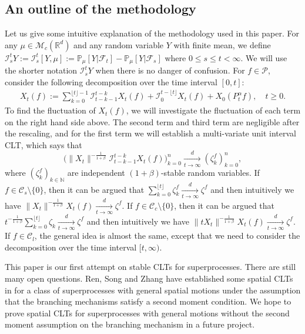 \documentclass[EJP]{ejpecp} %
\begin{document}
\subsection{An outline of the methodology}
Let us give some intuitive explanation of the methodology used in this paper.
For any $\mu\in \mathcal M_c(\mathbb R^d)$ and any random variable $Y$ with finite mean, we define
$
  \mathcal I_s^t Y
  := \mathcal I_s^t [Y, \mu]
  := \mathbb P_\mu[Y|\mathscr F_t] - \mathbb P_\mu[Y|\mathscr F_s]
$
  where $0 \leq s \leq t <\infty.$
We will use the shorter notation $\mathcal I_s^t Y$ when there is no danger of confusion.
For $f\in \mathcal{P}$, consider the following decomposition over the time interval $[0,t]$:
\begin{align}
  X_t(f)
  := \sum_{k=0}^{\lfloor t \rfloor-1} \mathcal I_{t-k-1}^{t-k} X_t (f)+\mathcal I_0^{t-\lfloor t \rfloor} X_t(f) + X_0( P^\alpha_tf),
  \quad t\geq 0.
\end{align}
To find the fluctuation of $X_t(f)$, we will investigate the fluctuation of each term on the right hand side above.
The second term and third term are negligible after the rescaling, and for the first term we will establish
a multi-variate unit interval CLT,  which says that
\[
  \Big( \|X_t\|^{-\frac{1}{1+\beta}}\mathcal I^{t-k}_{t-k-1} X_t(f) \Big)_{k=0}^n
  \xrightarrow [t\to \infty]{d} (\zeta^f_k)_{k=0}^n,
\]
where $(\zeta^f_k)_{k \in \mathbb N}$ are independent $(1+\beta)$-stable random variables.
If $f \in \mathcal C_s\setminus\{0\}$, then it can be argued that $\sum_{k=0}^{\lfloor t \rfloor} \zeta^f_k \xrightarrow[t\to \infty]{d} \zeta^f$ and then intuitively we have
\(
  \|X_t\|^{-\frac{1}{1+\beta}}  X_t(f)
  \xrightarrow[t\to \infty]{d} \zeta^f.
  \)
If $f \in \mathcal C_c \setminus \{0\}$, then it can be argued that
\(
t^{-\frac{1}{1+\beta}} \sum_{k=0}^{\lfloor t\rfloor} \zeta_k \xrightarrow[t\to \infty]{ d} \zeta^f
\)
and then intuitively we have
\(
\|tX_t\|^{-\frac{1}{1+\beta}}  X_t(f)
\xrightarrow[t\to \infty]{d} \zeta^f.
\)
If $f\in \mathcal C_l$, the general idea is almost the same, except that we need to consider the decomposition over the time interval $[t,\infty)$.


This paper is our first attempt on stable CLTs for superprocesses.
There are still many open questions.
Ren, Song and Zhang have established some spatial  CLTs in \cite{RenSongZhang2015Central} for a class of superprocesses with general spatial motions under
the assumption that the branching mechanisms satisfy a second moment condition.
We hope to prove spatial CLTs for superprocesses with general motions without the second moment assumption on the branching mechanism in a future project.
\end{document}
